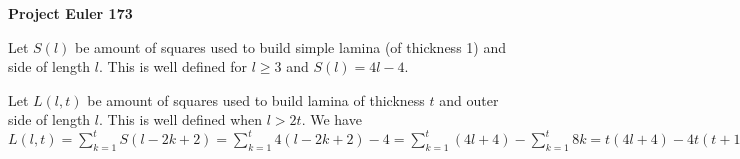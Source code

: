 \documentclass[a4paper,12pt]{article}
\begin{document}
\setlength\parindent{0pt}
\textbf{Project Euler 173}
\vspace{5ex}

Let \(S(l)\) be amount of squares used to build simple lamina (of thickness 1) and side of length \(l\). This is well defined for \(l \geq 3\) and \(S(l) = 4l - 4\).

Let \(L(l, t)\) be amount of squares used to build lamina of thickness \(t\) and outer side of length \(l\). This is well defined when \(l > 2t\). We have \(L(l, t) = \sum_{k = 1}^t S(l - 2k + 2) = \sum_{k = 1}^t 4(l - 2k + 2) - 4 = \sum_{k = 1}^t (4l + 4) - \sum_{k = 1}^t 8k = t(4l + 4) - 4t(t+1) = 4lt - 4t^2 = 4t(l-t) \)
\end{document}
